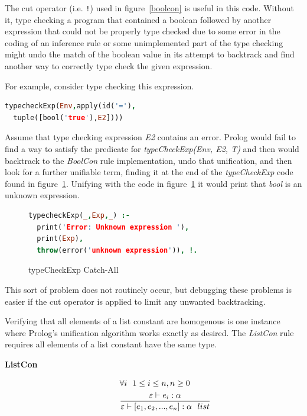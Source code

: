 \documentclass[10pt]{luthercs}
\begin{document}
The cut operator (i.e. \verb+!+) used in figure~\ref{boolcon} is useful in this code. Without it, type checking a program that contained a boolean followed by another expression that could not be properly type checked due to some error in the coding of an inference rule or some unimplemented part of the type checking might undo the match of the boolean value in its attempt to backtrack and find another way to correctly type check the given expression. 

For example, consider type checking this expression. 

\begin{lstlisting}[language=Prolog]
typecheckExp(Env,apply(id('='),
  tuple([bool('true'),E2])))
\end{lstlisting}

\noindent Assume that type checking expression {\em E2} contains an error. Prolog would fail to find a way to satisfy the predicate for {\em typeCheckExp(Env, E2, T)} and then would backtrack to the {\em BoolCon} rule implementation, undo that unification, and then look for a further unifiable term, finding it at the end of the {\em typeCheckExp} code found in figure~\ref{typecheckcatchall}. Unifying with the code in figure~\ref{typecheckcatchall} it would print that {\em bool} is an unknown expression. 

\begin{figure}[htbp]
\begin{lstlisting}[language=Prolog]
typecheckExp(_,Exp,_) :- 
  print('Error: Unknown expression '), 
  print(Exp),
  throw(error('unknown expression')), !.
\end{lstlisting}
\caption{typeCheckExp Catch-All}
\label{typecheckcatchall}
\end{figure}

This sort of problem does not routinely occur, but debugging these problems is easier if the cut operator is applied to limit any unwanted backtracking. 

Verifying that all elements of a list constant are homogenous is one instance where Prolog's unification algorithm works exactly as desired. The {\em ListCon} rule requires all elements of a list constant have the same type.

\begin{description}
\item[{\textbf{ListCon}}] \begin{gather}
\begin{split}& \forall i~~1\leq i \leq n, n \geq 0\\
& \frac{\varepsilon\vdash e_i:\alpha}{\varepsilon\vdash [e_1,e_2,...,e_n] : \alpha~~list}\end{split}\notag
\end{gather}
\end{description}
\end{document}
